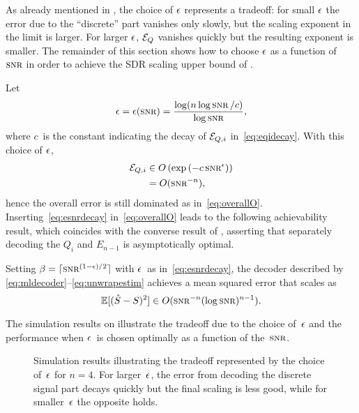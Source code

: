 As already mentioned in , the choice of $\epsilon$ represents a
tradeoff: for small $\epsilon$ the error due to the ``discrete'' part vanishes only
slowly, but the scaling exponent in the limit is larger. For larger $\epsilon$, ${{\mathcal{E}}_Q}$
vanishes quickly but the resulting exponent is smaller. The remainder of this
section shows how to choose $\epsilon$ as a function of~$\snr$ in order to achieve the
SDR scaling upper bound of .

Let
\begin{equation}
  \label{eq:esnrdecay}
  \e = \e(\snr) = \frac{\log(n \log\snr / c)}{\log\snr},
\end{equation}
where $c$~is the constant indicating the decay of ${{\mathcal{E}}_{Q,i}}$ in~\eqref{eq:eqidecay}.
With this choice of $\epsilon$,
\begin{align*}
  \Eqi &\in O\left( \exp\left( - c \snr^\e \right) \right) \\
 &= O(\snr^{-n}),
\end{align*}
hence the overall error is still dominated as in~\eqref{eq:overallO}.
Inserting~\eqref{eq:esnrdecay} in~\eqref{eq:overallO} leads to the following
achievability result, which coincides with the converse result of
, asserting that separately decoding the $Q_i$ and $E_{n-1}$
is asymptotically optimal.
\begin{theorem}
  \label{thm:scalarachievability}
  Setting $\beta = \lceil \snr^{(1-\e)/2} \rceil$ with $\epsilon$~as
  in~\eqref{eq:esnrdecay}, the decoder described by
  \eqref{eq:mldecoder}--\eqref{eq:unwrapestim} achieves a mean squared error
  that scales as
  \begin{equation*}
    \mse \in O(\snr^{-n} (\log\snr)^{n-1}).
  \end{equation*}
\end{theorem}

The simulation results on  illustrate the tradeoff due to
the choice of~$\epsilon$ and the performance when $\epsilon$~is chosen optimally as a
function of the~$\snr$.
\begin{figure}
  \begin{center}
    
  \end{center}
  \caption{Simulation results illustrating the tradeoff represented by the
  choice of~$\epsilon$ for $n = 4$. For larger~$\epsilon$, the error from decoding the
  discrete signal part decays quickly but the final scaling is less good, while
  for smaller~$\epsilon$ the opposite holds.}
  \label{fig:escalingsim}
\end{figure}




